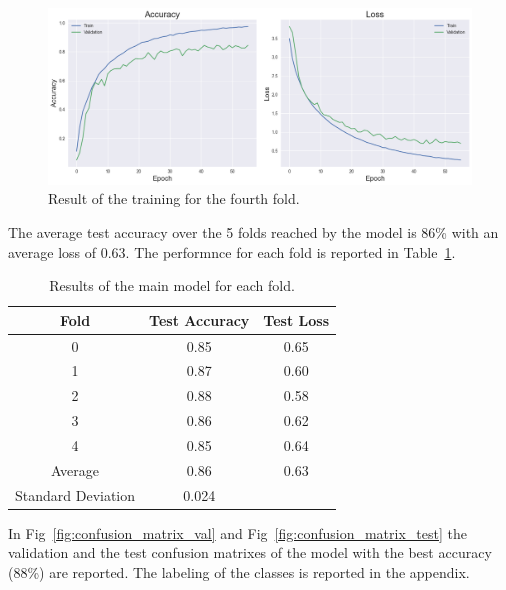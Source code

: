 \documentclass{article}
\begin{document}
\begin{sloppy}
\begin{figure}[ht]
  \centering
  \centerline{\includegraphics[width=\columnwidth]{fold4.png}}
  \caption{Result of the training for the fourth fold.}
  \label{fig:fold4}
\end{figure}

The average test accuracy over the 5 folds reached by the model is 86\% with an average loss of 0.63.
The performnce for each fold is reported in Table~\ref{tab:folds_results}.

\begin{table}[ht]
  \centering
  \caption{Results of the main model for each fold.}
  \label{tab:folds_results}
  \begin{tabular}{|c|c|c|}
    \hline
    Fold & Test Accuracy & Test Loss \\
    \hline
    0 & 0.85 & 0.65 \\
    1 & 0.87 & 0.60 \\
    2 & 0.88 & 0.58 \\
    3 & 0.86 & 0.62 \\
    4 & 0.85 & 0.64 \\
    \hline
    Average & 0.86 & 0.63 \\
    \hline
    Standard Deviation & 0.024 &  \\
    \hline
  \end{tabular}
\end{table}

In Fig~\ref{fig:confusion_matrix_val} and Fig~\ref{fig:confusion_matrix_test} the
validation and the test confusion matrixes of the model with the best accuracy (88\%) are reported. The
labeling of the classes is reported in the appendix.


\end{sloppy}
\end{document}
